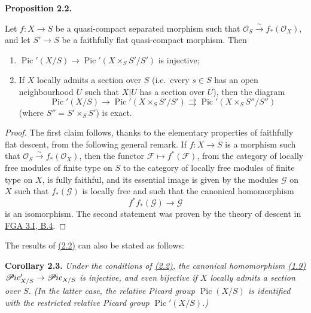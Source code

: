 \documentclass{article}
\providecommand{\tightlist}{%
  \setlength{\itemsep}{0pt}\setlength{\parskip}{0pt}}
\newenvironment{itenv}[1]
  {\phantomsection\par\smallskip\noindent\textbf{#1.}\itshape}
  {\par\smallskip}
\newcommand{\oldpage}[1]{\marginpar{\footnotesize$\Big\vert$ \textit{p.~#1}}}
\theoremstyle{definition}
\theoremstyle{definition}
\theoremstyle{definition}
\theoremstyle{definition}
\theoremstyle{remark}
\begin{document}
\hypertarget{fga-3-v-proposition-2.2}{}
\begin{itenv}{Proposition 2.2}

Let \(f\colon X\to S\) be a quasi-compact separated morphism such that \({\mathscr{O}}_S\xrightarrow{\sim}f_*({\mathscr{O}}_X)\), and let \(S'\to S\) be a faithfully flat quasi-compact morphism.
Then

\begin{enumerate}
\def\labelenumi{\roman{enumi}.}
\tightlist
\item
  \(\operatorname{Pic}'(X/S)\to\operatorname{Pic}'(X\times_S S'/S')\) is injective;
\item
  If \(X\) locally admits a section over \(S\) (i.e.~every \(s\in S\) has an open neighbourhood \(U\) such that \(X|U\) has a section over \(U\)), then the diagram
  \[
  \operatorname{Pic}'(X/S)
  \to \operatorname{Pic}'(X\times_S S'/S')
  \rightrightarrows \operatorname{Pic}'(X\times_S S''/S'')
    \]
  (where \(S''=S'\times_S S'\)) is exact.
\end{enumerate}

\end{itenv}

\begin{proof}
The first claim follows, thanks to the elementary properties of faithfully flat descent, from the following general remark.
\oldpage{232-05}If \(f\colon X\to S\) is a morphism such that \({\mathscr{O}}_S\xrightarrow{\sim}f_*({\mathscr{O}}_X)\), then the functor \({\mathscr{F}}\mapsto f^*({\mathscr{F}})\), from the category of locally free modules of finite type on \(S\) to the category of locally free modules of finite type on \(X\), is fully faithful, and its essential image is given by the modules \({\mathscr{G}}\) on \(X\) such that \(f_*({\mathscr{G}})\) is locally free and such that the canonical homomorphism
\[
  f^*f_*({\mathscr{G}})
  \to {\mathscr{G}}
\]
is an isomorphism.
The second statement was proven by the theory of descent in \protect\hyperlink{fga-3-i-section-B.4}{FGA 3.I, B.4}.
\end{proof}

The results of \protect\hyperlink{fga-3-v-proposition-2.2}{(2.2)} can also be stated as follows:

\leavevmode{}%
\begin{itenv}{Corollary 2.3}
Under the conditions of \protect\hyperlink{fga-3-v-proposition-2.2}{(2.2)}, the canonical homomorphism \protect\hyperlink{fga-3-v-equation-1.9}{(1.9)} \(\mathscr{P}\kern -.5pt ic'_{X/S}\to\mathscr{P}\kern -.5pt ic_{X/S}\) is injective, and even bijective if \(X\) locally admits a section over \(S\).
(In the latter case, the relative Picard group \(\operatorname{Pic}(X/S)\) is identified with the restricted relative Picard group \(\operatorname{Pic}'(X/S)\).)

\end{itenv}
\end{document}
